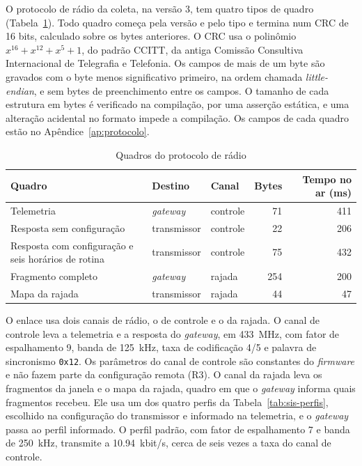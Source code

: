 O protocolo de rádio da coleta, na versão 3, tem quatro tipos de quadro (Tabela~\ref{tab:sis-quadros}). Todo quadro começa pela versão e pelo tipo e termina num CRC de \num{16} bits, calculado sobre os bytes anteriores. O CRC usa o polinômio $x^{16} + x^{12} + x^{5} + 1$, do padrão CCITT, da antiga Comissão Consultiva Internacional de Telegrafia e Telefonia. Os campos de mais de um byte são gravados com o byte menos significativo primeiro, na ordem chamada \textit{little-endian}, e sem bytes de preenchimento entre os campos. O tamanho de cada estrutura em bytes é verificado na compilação, por uma asserção estática, e uma alteração acidental no formato impede a compilação. Os campos de cada quadro estão no Apêndice~\ref{ap:protocolo}.

\begin{table}[!htb]
\centering\small
\caption{Quadros do protocolo de rádio}\label{tab:sis-quadros}
\begin{tabular}{@{}>{\raggedright\arraybackslash}p{62mm}llrr@{}}
\toprule
Quadro & Destino & Canal & Bytes & Tempo no ar (ms) \\
\midrule
Telemetria & \textit{gateway} & controle & \num{71} & \num{411} \\
Resposta sem configuração & transmissor & controle & \num{22} & \num{206} \\
Resposta com configuração e seis horários de rotina & transmissor & controle & \num{75} & \num{432} \\
Fragmento completo & \textit{gateway} & rajada & \num{254} & \num{200} \\
Mapa da rajada & transmissor & rajada & \num{44} & \num{47} \\
\bottomrule
\end{tabular}
\end{table}

O enlace usa dois canais de rádio, o de controle e o da rajada. O canal de controle leva a telemetria e a resposta do \textit{gateway}, em \SI{433}{\mega\hertz}, com fator de espalhamento 9, banda de \SI{125}{\kilo\hertz}, taxa de codificação 4/5 e palavra de sincronismo \texttt{0x12}. Os parâmetros do canal de controle são constantes do \textit{firmware} e não fazem parte da configuração remota (R3). O canal da rajada leva os fragmentos da janela e o mapa da rajada, quadro em que o \textit{gateway} informa quais fragmentos recebeu. Ele usa um dos quatro perfis da Tabela~\ref{tab:sis-perfis}, escolhido na configuração do transmissor e informado na telemetria, e o \textit{gateway} passa ao perfil informado. O perfil padrão, com fator de espalhamento 7 e banda de \SI{250}{\kilo\hertz}, transmite a \SI{10,94}{kbit/s}, cerca de seis vezes a taxa do canal de controle.

